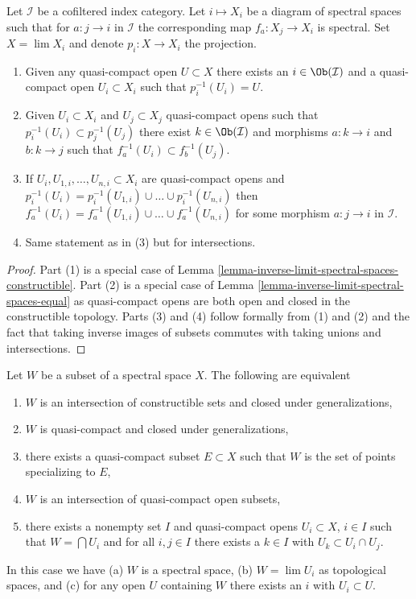 \begin{lemma}
\label{lemma-descend-opens}
Let $\mathcal{I}$ be a cofiltered index category.
Let $i \mapsto X_i$ be a diagram of spectral spaces such
that for $a : j \to i$ in $\mathcal{I}$ the corresponding map
$f_a : X_j \to X_i$ is spectral. Set $X = \lim X_i$ and denote
$p_i : X \to X_i$ the projection.
\begin{enumerate}
\item Given any quasi-compact open $U \subset X$
there exists an $i \in \Ob(\mathcal{I})$ and a quasi-compact open
$U_i \subset X_i$ such that $p_i^{-1}(U_i) = U$.
\item Given $U_i \subset X_i$ and $U_j \subset X_j$
quasi-compact opens such that $p_i^{-1}(U_i) \subset p_j^{-1}(U_j)$
there exist $k \in \Ob(\mathcal{I})$ and morphisms
$a : k \to i$ and $b : k \to j$ such that $f_a^{-1}(U_i) \subset f_b^{-1}(U_j)$.
\item If $U_i, U_{1, i}, \ldots, U_{n, i} \subset X_i$ are quasi-compact
opens and
$p_i^{-1}(U_i) = p_i^{-1}(U_{1, i}) \cup \ldots \cup p_i^{-1}(U_{n, i})$
then
$f_a^{-1}(U_i) = f_a^{-1}(U_{1, i}) \cup \ldots \cup f_a^{-1}(U_{n, i})$
for some morphism $a : j \to i$ in $\mathcal{I}$.
\item Same statement as in (3) but for intersections.
\end{enumerate}
\end{lemma}

\begin{proof}
Part (1) is a special case of
Lemma \ref{lemma-inverse-limit-spectral-spaces-constructible}.
Part (2) is a special case of
Lemma \ref{lemma-inverse-limit-spectral-spaces-equal}
as quasi-compact opens are both open and closed in the constructible
topology. Parts (3) and (4) follow formally from (1) and (2)
and the fact that taking inverse images of subsets commutes with
taking unions and intersections.
\end{proof}

\begin{lemma}
\label{lemma-make-spectral-space}
Let $W$ be a subset of a spectral space $X$. The following are equivalent
\begin{enumerate}
\item $W$ is an intersection of constructible sets and
closed under generalizations,
\item $W$ is quasi-compact and closed under generalizations,
\item there exists a quasi-compact subset $E \subset X$ such that
$W$ is the set of points specializing to $E$,
\item $W$ is an intersection of quasi-compact open subsets,
\item
\label{item-intersection-quasi-compact-open}
there exists a nonempty set $I$ and quasi-compact opens
$U_i \subset X$, $i \in I$
such that $W = \bigcap U_i$ and for all $i, j \in I$ there exists a
$k \in I$ with $U_k \subset U_i \cap U_j$.
\end{enumerate}
In this case we have (a) $W$ is a spectral space, (b) $W = \lim U_i$
as topological spaces, and (c) for any open $U$ containing $W$
there exists an $i$ with $U_i \subset U$.
\end{lemma}

